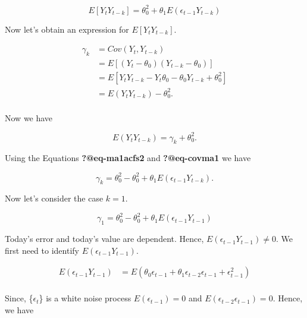 \documentclass[
  11pt,
  a4paper,
]{report}
\begin{document}
\begin{equation}
E[Y_tY_{t-k}] = \theta_0^2  + \theta_1 E(\epsilon_{t-1}Y_{t-k}) 
\end{equation}

Now let's obtain an expression for \(E[Y_t Y_{t-k}]\).

\begin{equation}
\begin{aligned}
  \gamma_k &= Cov(Y_t, Y_{t-k}) \\
         &= E[(Y_t-\theta_0)(Y_{t-k}-\theta_0)] \\
         &= E[Y_tY_{t-k}-Y_t\theta_0-\theta_0 Y_{t-k} +\theta_0^2] \\
         &= E(Y_t Y_{t-k}) - \theta_0^2. \\
\end{aligned}
\end{equation}

Now we have

\begin{equation}
  E(Y_t Y_{t-k}) = \gamma_k + \theta_0^2.
\end{equation}

Using the Equations \textbf{?@eq-ma1acfs2} and \textbf{?@eq-covma1} we
have

\begin{equation}
  \gamma_k = \theta_0^2 - \theta_0^2 + \theta_1E(\epsilon_{t-1}Y_{t-k}).
\end{equation}

Now let's consider the case \(k=1\).

\begin{equation}
  \gamma_1 = \theta_0^2 - \theta_0^2 + \theta_1E(\epsilon_{t-1}Y_{t-1})
\end{equation}

Today's error and today's value are dependent. Hence,
\(E(\epsilon_{t-1}Y_{t-1}) \neq 0.\) We first need to identify
\(E(\epsilon_{t-1}Y_{t-1})\).

\begin{equation}
\begin{aligned}
E(\epsilon_{t-1}Y_{t-1}) &= E(\theta_0 \epsilon_{t-1} + \theta_1 \epsilon_{t-2} \epsilon_{t-1}+ \epsilon_{t-1}^2)\\
\end{aligned}
\end{equation}

Since, \{\(\epsilon_t\)\} is a white noise process
\(E(\epsilon_{t-1}) = 0\) and \(E(\epsilon_{t-2} \epsilon_{t-1}) = 0\).
Hence, we have
\end{document}
